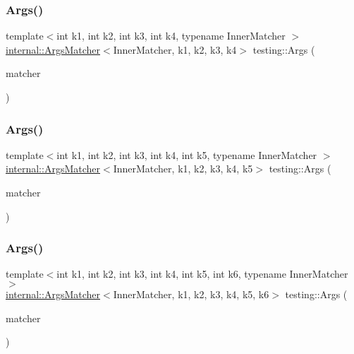 \mbox{\label{namespacetesting_aeff7e644fd00516c3519fe8c0dc1aee2}} 
\subsubsection{\texorpdfstring{Args()}{Args()}\hspace{0.1cm}{\footnotesize\ttfamily [5/11]}}
{\footnotesize\ttfamily template$<$int k1, int k2, int k3, int k4, typename Inner\+Matcher $>$ \\
\mbox{\hyperlink{classtesting_1_1internal_1_1ArgsMatcher}{internal\+::\+Args\+Matcher}}$<$Inner\+Matcher, k1, k2, k3, k4$>$ testing\+::\+Args (\begin{DoxyParamCaption}\item[{const Inner\+Matcher \&}]{matcher }\end{DoxyParamCaption})\hspace{0.3cm}{\ttfamily [inline]}}

\mbox{\label{namespacetesting_aede9fd33cce0d21f5e31ba10a0706827}} 
\subsubsection{\texorpdfstring{Args()}{Args()}\hspace{0.1cm}{\footnotesize\ttfamily [6/11]}}
{\footnotesize\ttfamily template$<$int k1, int k2, int k3, int k4, int k5, typename Inner\+Matcher $>$ \\
\mbox{\hyperlink{classtesting_1_1internal_1_1ArgsMatcher}{internal\+::\+Args\+Matcher}}$<$Inner\+Matcher, k1, k2, k3, k4, k5$>$ testing\+::\+Args (\begin{DoxyParamCaption}\item[{const Inner\+Matcher \&}]{matcher }\end{DoxyParamCaption})\hspace{0.3cm}{\ttfamily [inline]}}

\mbox{\label{namespacetesting_abc92e87b4a9cad372b082d81479f3d48}} 
\subsubsection{\texorpdfstring{Args()}{Args()}\hspace{0.1cm}{\footnotesize\ttfamily [7/11]}}
{\footnotesize\ttfamily template$<$int k1, int k2, int k3, int k4, int k5, int k6, typename Inner\+Matcher $>$ \\
\mbox{\hyperlink{classtesting_1_1internal_1_1ArgsMatcher}{internal\+::\+Args\+Matcher}}$<$Inner\+Matcher, k1, k2, k3, k4, k5, k6$>$ testing\+::\+Args (\begin{DoxyParamCaption}\item[{const Inner\+Matcher \&}]{matcher }\end{DoxyParamCaption})\hspace{0.3cm}{\ttfamily [inline]}}

